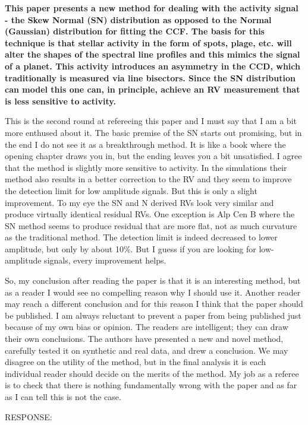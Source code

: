 \documentclass[11pt]{article}   	%
\begin{document}
{\bf This paper presents a new method for dealing with the activity signal - the Skew Normal (SN) distribution as opposed to the Normal (Gaussian) distribution for fitting the CCF. The basis for this technique is that stellar activity in the form of spots, plage, etc. will alter the shapes of the spectral line profiles and this mimics the signal of a planet. This activity introduces an asymmetry in the CCD, which traditionally is measured via line bisectors. Since the SN distribution can model this one can, in principle, achieve an RV measurement that is less sensitive to activity.

This is the second round at refereeing this paper and I must say that I am a bit more enthused about it. The basic premise of the SN starts out promising, but in the end I do not see it as a breakthrough method. It is like a book where the opening chapter draws you in, but the ending leaves you a bit unsatisfied.
I agree that the method is slightly more sensitive to activity. In the simulations their method also results in a better correction to the RV and they seem to improve the detection limit for low amplitude signals. But this is only a slight improvement. To my eye the SN and N derived RVs look very similar and produce virtually identical residual RVs. One exception is Alp Cen B where the SN method seems to produce residual that are more flat, not as much curvature as the traditional method. The detection limit is indeed decreased to lower amplitude, but only by about 10\%. But I guess if you are looking for low-amplitude signals, every improvement helps.

So, my conclusion after reading the paper is that it is an interesting method, but as a reader I would see no compelling reason why I should use it. Another reader may reach a different conclusion and for this reason I think that the paper should be published. I am always reluctant to prevent a paper from being published just because of my own bias or opinion. The readers are intelligent; they can draw their own conclusions. The authors have presented a new and novel method, carefully tested it on synthetic and real data, and drew a conclusion. We may disagree on the utility of the method, but in the final analysis it is each individual reader should decide on the merits of the method. My job as a referee is to check that there is nothing fundamentally wrong with the paper and as far as I can tell this is not the case.} 
\bigskip

\noindent RESPONSE:  

\bigskip
\end{document}
